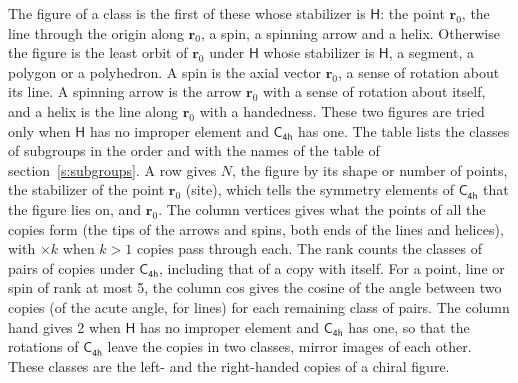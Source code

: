 \documentclass[10pt,a4paper]{article}
\numberwithin{equation}{section}
\newcommand{\grp}[1]{\mathsf{#1}}
\newcommand{\pointr}{\mathbf{r}}
\begin{document}
\leavevmode\label{n:head.figure}The figure of a class is the first of these whose stabilizer is $\grp{H}$: the point $\pointr_0$, the line through the origin along $\pointr_0$, a spin, a spinning arrow and a helix. Otherwise the figure is the least orbit of $\pointr_0$ under $\grp{H}$ whose stabilizer is $\grp{H}$, a segment, a polygon or a polyhedron. A spin is the axial vector $\pointr_0$, a sense of rotation about its line. A spinning arrow is the arrow $\pointr_0$ with a sense of rotation about itself, and a helix is the line along $\pointr_0$ with a handedness. These two figures are tried only when $\grp{H}$ has no improper element and $\grp{C_{4h}}$ has one. The table lists the classes of subgroups in the order and with the names of the table of section~\ref{s:subgroups}. \label{n:head.site}A row gives $N$, the figure by its shape or number of points, the stabilizer of the point $\pointr_0$ (site), which tells the symmetry elements of $\grp{C_{4h}}$ that the figure lies on, and $\pointr_0$. \label{n:head.vertices}The column vertices gives what the points of all the copies form (the tips of the arrows and spins, both ends of the lines and helices), with ${\times}k$ when $k > 1$ copies pass through each. \label{n:head.rank}The rank counts the classes of pairs of copies under $\grp{C_{4h}}$, including that of a copy with itself. \label{n:head.cos}For a point, line or spin of rank at most 5, the column cos gives the cosine of the angle between two copies (of the acute angle, for lines) for each remaining class of pairs. \label{n:head.hand}The column hand gives 2 when $\grp{H}$ has no improper element and $\grp{C_{4h}}$ has one, so that the rotations of $\grp{C_{4h}}$ leave the copies in two classes, mirror images of each other. These classes are the left- and the right-handed copies of a chiral figure.
\end{document}

